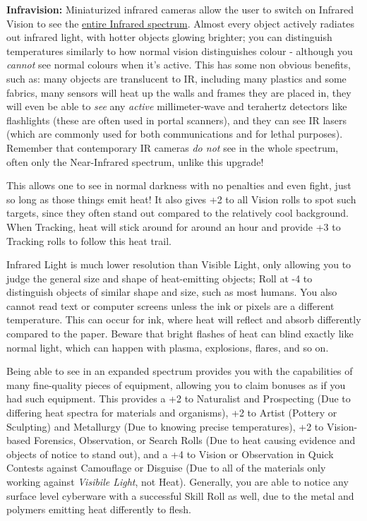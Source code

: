 \begin{multicols*}{3}
	\textbf{Infravision:} Miniaturized infrared cameras allow the user to switch on Infrared Vision to see the \textcolor{Blue}{\href{https://en.wikipedia.org/wiki/Infrared}{entire Infrared spectrum}}. Almost every object actively radiates out infrared light, with hotter objects glowing brighter; you can distinguish temperatures similarly to how normal vision distinguishes colour - although you \textit{cannot} see normal colours when it's active. This has some non obvious benefits, such as: many objects are translucent to IR, including many plastics and some fabrics, many sensors will heat up the walls and frames they are placed in, they will even be able to \textit{see} any \textit{active} millimeter-wave and terahertz detectors like flashlights (these are often used in portal scanners), and they can see IR lasers (which are commonly used for both communications and for lethal purposes). Remember that contemporary IR cameras \textit{do not} see in the whole spectrum, often only the Near-Infrared spectrum, unlike this upgrade!
	
	
	This allows one to see in normal darkness with no penalties and even fight, just so long as those things emit heat! It also gives +2 to all Vision rolls to spot such targets, since they often stand out compared to the relatively cool background. When Tracking, heat will stick around for around an hour and provide +3 to Tracking rolls to follow this heat trail.
	
	Infrared Light is much lower resolution than Visible Light, only allowing you to judge the general size and shape of heat-emitting objects; Roll at -4 to distinguish objects of similar shape and size, such as most humans. You also cannot read text or computer screens unless the ink or pixels are a different temperature. This can occur for ink, where heat will reflect and absorb differently compared to the paper. Beware that bright flashes of heat can blind exactly like normal light, which can happen with plasma, explosions, flares, and so on.
	
	Being able to see in an expanded spectrum provides you with the capabilities of many fine-quality pieces of equipment, allowing you to claim bonuses as if you had such equipment. This provides a +2 to Naturalist and Prospecting (Due to differing heat spectra for materials and organisms), +2 to Artist (Pottery or Sculpting) and Metallurgy (Due to knowing precise temperatures), +2 to Vision-based Forensics, Observation, or Search Rolls (Due to heat causing evidence and objects of notice to stand out), and a +4 to Vision or Observation in Quick Contests against Camouflage or Disguise (Due to all of the materials only working against \textit{Visibile Light}, not Heat). Generally, you are able to notice any surface level cyberware with a successful Skill Roll as well, due to the metal and polymers emitting heat differently to flesh.
	

\end{multicols*}
